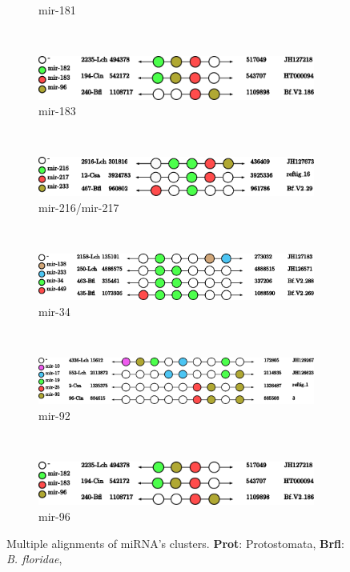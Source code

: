 \documentclass[graybox]{svmult}
\begin{document}
\begin{figure}[ht!]
\begin{subfigure}[t]{0.45\textwidth}
        \caption{mir-181}
       \end{subfigure}
        ~
         \begin{subfigure}[t]{0.45\textwidth}
        \centering
        \includegraphics[height=1.2 cm]{./Images/Cluster_images/mir-183_132_240}
        \caption{mir-183}
    \end{subfigure}
    \\
    \begin{subfigure}[t]{0.45\textwidth}
        \centering
        \includegraphics[height=1.2 cm]{./Images/Cluster_images/mir-216_126_467}
        \caption{mir-216/mir-217}
       \end{subfigure}
     \\
    \begin{subfigure}[t]{0.45\textwidth}
        \centering
        \includegraphics[height=1.2 cm]{./Images/Cluster_images/mir-34_11A_435}
        \caption{mir-34}
       \end{subfigure}
        ~
         \begin{subfigure}[t]{0.45\textwidth}
        \centering
        \includegraphics[height=1.2 cm]{./Images/Cluster_images/mir-92_281_4336}
        \caption{mir-92}
    \end{subfigure}
    \\
    \begin{subfigure}[t]{1\textwidth}
        \centering
        \includegraphics[height=1.2 cm]{./Images/Cluster_images/mir-96_138_240}
        \caption{mir-96}
    \end{subfigure}
    \caption{Multiple alignments of miRNA's clusters. \textbf{Prot}: 
Protostomata, \textbf{Brfl}: \textit{B. floridae}, 
}
\end{figure}
\end{document}
